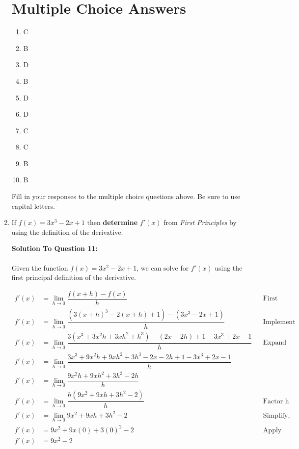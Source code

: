 \documentclass[12pt]{book}
\begin{document}
\begin{enumerate}
\newpage

\section*{Multiple Choice Answers}

\begin{enumerate}[label={\arabic*.}]
\item C
\item B
\item D
\item B
\item D
\item D
\item C
\item C
\item B
\item B
\end{enumerate}

Fill in your responses to the multiple choice questions above. Be sure to use capital letters.

\newpage

\item If $f(x) = 3x^3 - 2x + 1$ then \textbf{determine} $f'(x)$ from \emph{First Principles} by using the definition of the derivative.


\vspace{0.3cm} 
\textbf{Solution To Question 11:}\\
\\
Given the function $f(x) = 3x^2-2x+1$, we can solve for $f'(x)$ using the first principal 
definition of the derivative.

\addtolength{\jot}{1em}
\begin{align*}
    f'(x) &= \lim_{h \to 0} \dfrac{f(x+h)-f(x)}{h} && \text{First Principle Definition} \\
    f'(x) &= \lim_{h \to 0} \dfrac{(3(x+h)^3 - 2(x+h) + 1) - (3x^3-2x+1)}{h} && \text{Implement f(x) with x+h and x} \\
    f'(x) &= \lim_{h \to 0} \dfrac{3(x^3+3x^2h+3xh^2+h^3) - (2x+2h) + 1 - 3x^3+2x-1}{h} && \text{Expand and Simplify} \\
    f'(x) &= \lim_{h \to 0} \dfrac{3x^3+9x^2h+9xh^2+3h^3 - 2x-2h + 1 - 3x^3+2x-1}{h} \\
    f'(x) &= \lim_{h \to 0} \dfrac{9x^2h+9xh^2+3h^3 -2h}{h} \\
    f'(x) &= \lim_{h \to 0} \dfrac{h(9x^2+9xh+3h^2 -2)}{h} && \text{Factor h} \\
    f'(x) &= \lim_{h \to 0} 9x^2+9xh+3h^2 -2 && \text{Simplify, Cross out h} \\
    f'(x) &= 9x^2+9x(0)+3(0)^2 -2 && \text{Apply Limit} \\
    f'(x) &= 9x^2 - 2 \\
\end{align*}


\end{enumerate}
\end{document}
